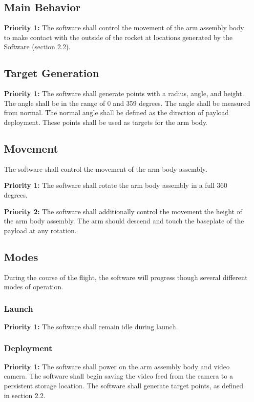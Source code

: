 \documentclass[letterpaper,10pt]{article}
\begin{document}
\subsection{Main Behavior}
\textbf{Priority 1:}
The software shall control the movement of the arm assembly body to make contact with the outside of the rocket
at locations generated by the Software (section 2.2). 

\subsection{Target Generation}
\textbf{Priority 1:}
The software shall generate points with a radius, angle, and height. 
The angle shall be in the range of 0 and 359 degrees.
The angle shall be measured from normal.
The normal angle shall be defined as the direction of payload deployment.
These points shall be used as targets for the arm body.

\subsection{Movement}
The software shall control the movement of the arm body assembly. 

\textbf{Priority 1:}
The software shall rotate the arm body assembly in a full 360 degrees.

\textbf{Priority 2:}
The software shall additionally control the movement the height of the arm body assembly.
The arm should descend and touch the baseplate of the payload at any rotation.

\subsection{Modes}
During the course of the flight, the software will progress though several different modes of operation.

\subsubsection{Launch}
\textbf{Priority 1:}
The software shall remain idle during launch.

\subsubsection{Deployment}
\textbf{Priority 1:}
The software shall power on the arm assembly body and video camera.
The software shall begin saving the video feed from the camera to a persistent storage location.
The software shall generate target points, as defined in section 2.2.
\end{document}

